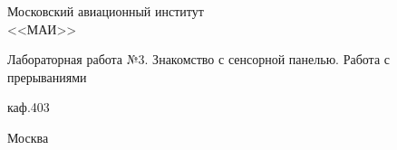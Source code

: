 \newpage
\thispagestyle{empty}

\begin{center}
\begin{Large}
Московский авиационный институт 
\\<<МАИ>>
\end{Large}
\end{center}
\vspace{20em}
\begin{center}
\begin{spacing}{2.0}
{\huge Лабораторная работа №3. Знакомство с сенсорной панелью. Работа с прерываниями}
\end{spacing}
\end{center}
\begin{center}
каф.403
\end{center}

\vspace{\fill}

\begin{center}
Москва \the\year
\end{center}